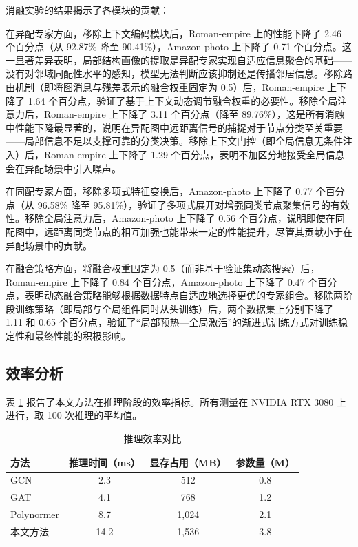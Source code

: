\documentclass[a4paper,10pt]{article}
\begin{document}
消融实验的结果揭示了各模块的贡献：

在异配专家方面，移除上下文编码模块后，Roman-empire 上的性能下降了 2.46 个百分点（从 92.87\% 降至 90.41\%），Amazon-photo 上下降了 0.71 个百分点。这一显著差异表明，局部结构画像的提取是异配专家实现自适应信息聚合的基础——没有对邻域同配性水平的感知，模型无法判断应该抑制还是传播邻居信息。移除路由机制（即将图消息与残差表示的融合权重固定为 0.5）后，Roman-empire 上下降了 1.64 个百分点，验证了基于上下文动态调节融合权重的必要性。移除全局注意力后，Roman-empire 上下降了 3.11 个百分点（降至 89.76\%），这是所有消融中性能下降最显著的，说明在异配图中远距离信号的捕捉对于节点分类至关重要——局部信息不足以支撑可靠的分类决策。移除上下文门控（即全局信息无条件注入）后，Roman-empire 上下降了 1.29 个百分点，表明不加区分地接受全局信息会在异配场景中引入噪声。

在同配专家方面，移除多项式特征变换后，Amazon-photo 上下降了 0.77 个百分点（从 96.58\% 降至 95.81\%），验证了多项式展开对增强同类节点聚集信号的有效性。移除全局注意力后，Amazon-photo 上下降了 0.56 个百分点，说明即使在同配图中，远距离同类节点的相互加强也能带来一定的性能提升，尽管其贡献小于在异配场景中的贡献。

在融合策略方面，将融合权重固定为 0.5（而非基于验证集动态搜索）后，Roman-empire 上下降了 0.84 个百分点，Amazon-photo 上下降了 0.47 个百分点，表明动态融合策略能够根据数据特点自适应地选择更优的专家组合。移除两阶段训练策略（即局部与全局组件同时从头训练）后，两个数据集上分别下降了 1.11 和 0.65 个百分点，验证了“局部预热—全局激活”的渐进式训练方式对训练稳定性和最终性能的积极影响。

\subsection{效率分析}

表 \ref{tab:efficiency} 报告了本文方法在推理阶段的效率指标。所有测量在 NVIDIA RTX 3080 上进行，取 100 次推理的平均值。

\begin{table}[t]
\centering
\caption{推理效率对比}
\label{tab:efficiency}
\begin{tabular}{l c c c}
\toprule
方法 & 推理时间（ms） & 显存占用（MB） & 参数量（M） \\
\midrule
GCN & 2.3 & 512 & 0.8 \\
GAT & 4.1 & 768 & 1.2 \\
Polynormer & 8.7 & 1,024 & 2.1 \\
本文方法 & 14.2 & 1,536 & 3.8 \\
\bottomrule
\end{tabular}
\end{table}
\end{document}
